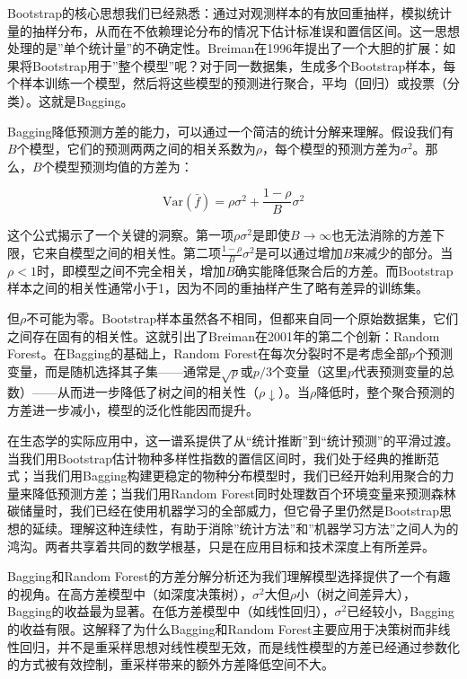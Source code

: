 \documentclass[
  twoside,12pt,fontset=none]{ctexbook}
\begin{document}
Bootstrap的核心思想我们已经熟悉：通过对观测样本的有放回重抽样，模拟统计量的抽样分布，从而在不依赖理论分布的情况下估计标准误和置信区间。这一思想处理的是''单个统计量''的不确定性。Breiman在1996年提出了一个大胆的扩展：如果将Bootstrap用于''整个模型''呢？对于同一数据集，生成多个Bootstrap样本，每个样本训练一个模型，然后将这些模型的预测进行聚合，平均（回归）或投票（分类）。这就是Bagging。

Bagging降低预测方差的能力，可以通过一个简洁的统计分解来理解。假设我们有\(B\)个模型，它们的预测两两之间的相关系数为\(\rho\)，每个模型的预测方差为\(\sigma^2\)。那么，\(B\)个模型预测均值的方差为：

\[\text{Var}(\bar{f}) = \rho\sigma^2 + \frac{1-\rho}{B}\sigma^2\]

这个公式揭示了一个关键的洞察。第一项\(\rho\sigma^2\)是即使\(B \to \infty\)也无法消除的方差下限，它来自模型之间的相关性。第二项\(\frac{1-\rho}{B}\sigma^2\)是可以通过增加\(B\)来减少的部分。当\(\rho < 1\)时，即模型之间不完全相关，增加\(B\)确实能降低聚合后的方差。而Bootstrap样本之间的相关性通常小于1，因为不同的重抽样产生了略有差异的训练集。

但\(\rho\)不可能为零。Bootstrap样本虽然各不相同，但都来自同一个原始数据集，它们之间存在固有的相关性。这就引出了Breiman在2001年的第二个创新：Random Forest。在Bagging的基础上，Random Forest在每次分裂时不是考虑全部\(p\)个预测变量，而是随机选择其子集------通常是\(\sqrt{p}\)或\(p/3\)个变量（这里\(p\)代表预测变量的总数）------从而进一步降低了树之间的相关性（\(\rho \downarrow\)）。当\(\rho\)降低时，整个聚合预测的方差进一步减小，模型的泛化性能因而提升。

在生态学的实际应用中，这一谱系提供了从``统计推断''到``统计预测''的平滑过渡。当我们用Bootstrap估计物种多样性指数的置信区间时，我们处于经典的推断范式；当我们用Bagging构建更稳定的物种分布模型时，我们已经开始利用聚合的力量来降低预测方差；当我们用Random Forest同时处理数百个环境变量来预测森林碳储量时，我们已经在使用机器学习的全部威力，但它骨子里仍然是Bootstrap思想的延续。理解这种连续性，有助于消除''统计方法''和''机器学习方法''之间人为的鸿沟。两者共享着共同的数学根基，只是在应用目标和技术深度上有所差异。

Bagging和Random Forest的方差分解分析还为我们理解模型选择提供了一个有趣的视角。在高方差模型中（如深度决策树），\(\sigma^2\)大但\(\rho\)小（树之间差异大），Bagging的收益最为显著。在低方差模型中（如线性回归），\(\sigma^2\)已经较小，Bagging的收益有限。这解释了为什么Bagging和Random Forest主要应用于决策树而非线性回归，并不是重采样思想对线性模型无效，而是线性模型的方差已经通过参数化的方式被有效控制，重采样带来的额外方差降低空间不大。
\end{document}
